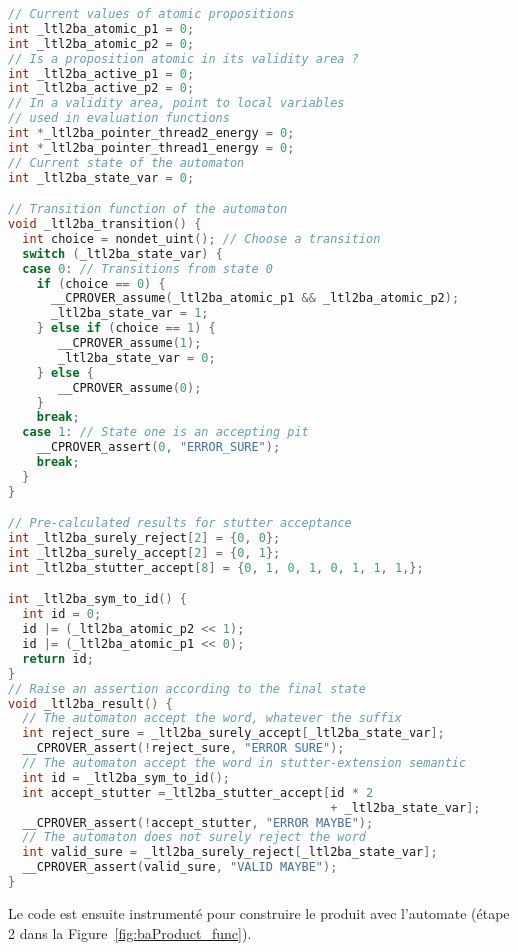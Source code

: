 \begin{lstlisting}[language=C, frame=single, caption=Automate encodé en C]
// Current values of atomic propositions
int _ltl2ba_atomic_p1 = 0;
int _ltl2ba_atomic_p2 = 0;
// Is a proposition atomic in its validity area ?
int _ltl2ba_active_p1 = 0;
int _ltl2ba_active_p2 = 0;
// In a validity area, point to local variables
// used in evaluation functions
int *_ltl2ba_pointer_thread2_energy = 0;
int *_ltl2ba_pointer_thread1_energy = 0;
// Current state of the automaton
int _ltl2ba_state_var = 0;

// Transition function of the automaton
void _ltl2ba_transition() {
  int choice = nondet_uint(); // Choose a transition
  switch (_ltl2ba_state_var) {
  case 0: // Transitions from state 0
    if (choice == 0) {
      __CPROVER_assume(_ltl2ba_atomic_p1 && _ltl2ba_atomic_p2);
      _ltl2ba_state_var = 1;
    } else if (choice == 1) {
       __CPROVER_assume(1);
       _ltl2ba_state_var = 0;
    } else {
       __CPROVER_assume(0);
    }
    break;
  case 1: // State one is an accepting pit
    __CPROVER_assert(0, "ERROR_SURE");
    break;
  }
}

// Pre-calculated results for stutter acceptance
int _ltl2ba_surely_reject[2] = {0, 0};
int _ltl2ba_surely_accept[2] = {0, 1};
int _ltl2ba_stutter_accept[8] = {0, 1, 0, 1, 0, 1, 1, 1,};

int _ltl2ba_sym_to_id() {
  int id = 0;
  id |= (_ltl2ba_atomic_p2 << 1);
  id |= (_ltl2ba_atomic_p1 << 0);
  return id;
}
// Raise an assertion according to the final state
void _ltl2ba_result() {
  // The automaton accept the word, whatever the suffix
  int reject_sure = _ltl2ba_surely_accept[_ltl2ba_state_var];
  __CPROVER_assert(!reject_sure, "ERROR SURE");
  // The automaton accept the word in stutter-extension semantic
  int id = _ltl2ba_sym_to_id();
  int accept_stutter =_ltl2ba_stutter_accept[id * 2
                                             + _ltl2ba_state_var];
  __CPROVER_assert(!accept_stutter, "ERROR MAYBE");
  // The automaton does not surely reject the word
  int valid_sure = _ltl2ba_surely_reject[_ltl2ba_state_var];
  __CPROVER_assert(valid_sure, "VALID MAYBE");
}
\end{lstlisting}

Le code est ensuite instrumenté pour construire le produit avec l'automate
(étape 2 dans la Figure~\ref{fig:baProduct_func}).


